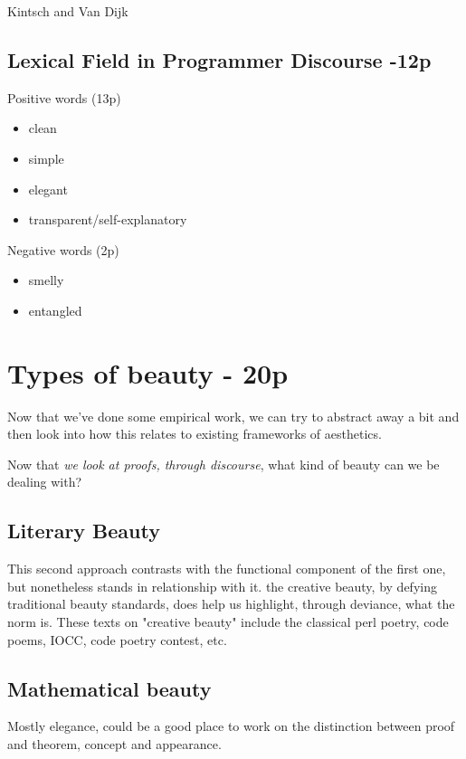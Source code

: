 Kintsch and Van Dijk

\subsection{Lexical Field in Programmer Discourse -12p}

Positive words (13p)

\begin{itemize}
    \item clean
    \item simple
    \item elegant
    \item transparent/self-explanatory
\end{itemize}

Negative words (2p)

\begin{itemize}
    \item smelly
    \item entangled
\end{itemize}

\section{Types of beauty  - 20p}

Now that we've done some empirical work, we can try to abstract away a bit and then look into how this relates to existing frameworks of aesthetics. 

Now that \emph{we look at proofs, through discourse}, what kind of beauty can we be dealing with?

\subsection{Literary Beauty}

This second approach contrasts with the functional component of the first one, but nonetheless stands in relationship with it. the creative beauty, by defying traditional beauty standards, does help us highlight, through deviance, what the norm is. These texts on "creative beauty" include the classical perl poetry, code poems, IOCC, code poetry contest, etc.

\subsection{Mathematical beauty}

Mostly elegance, could be a good place to work on the distinction between proof and theorem, concept and appearance.

